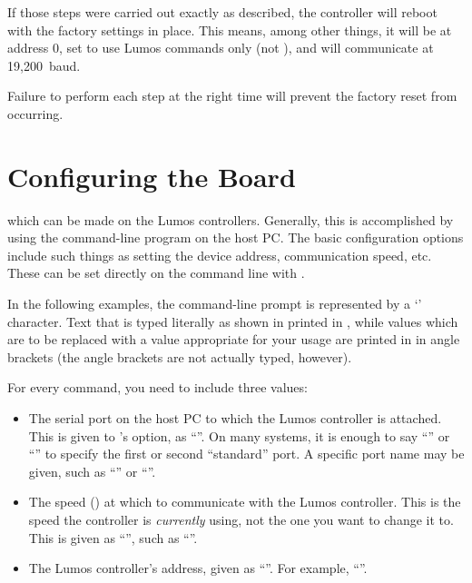 \documentclass[letterpaper,twoside,onecolumn,openright,final]{memoir}
\begin{document}
If those steps were carried out exactly as described, %
the controller will reboot with the factory settings in place.  This means, among other things,
it will be at address 0, set to use Lumos commands only (not ), and will communicate
at 19,200~baud.

Failure to perform each step at the right time will prevent the factory reset from occurring.

\chapter{Configuring the Board}
 which can be made on the Lumos controllers.  Generally,
this is accomplished by using the  com\-mand-line program on the host PC.  The basic configuration
options include such things as setting the device address, communication speed, etc.  These can be set
directly on the command line with .

In the following examples, the command-line prompt is represented by a `\z{\$}' character.
Text that is typed literally as shown in printed in , while values which are
to be replaced with a value appropriate for your usage are printed in  in angle brackets
(the angle brackets are not actually typed, however).

For every command, you need to include three values:
\begin{itemize}
	\item 	The serial port on the host PC to which the Lumos controller is attached.  This is
		given to 's  option, as ``''.  On many
		systems, it is enough to say ``'' or ``'' to specify the first
		or second ``standard'' port.  A specific port name may be given, such as 
		``'' or ``''.
	\item	The speed () at which to communicate with the Lumos controller.  This is
		the speed the controller is \emph{currently} using, not the one you want to change it
		to.  This is given as ``'', such as ``''.
	\item	The Lumos controller's address, given as ``''.  For example,
		``''.
\end{itemize}
\end{document}
